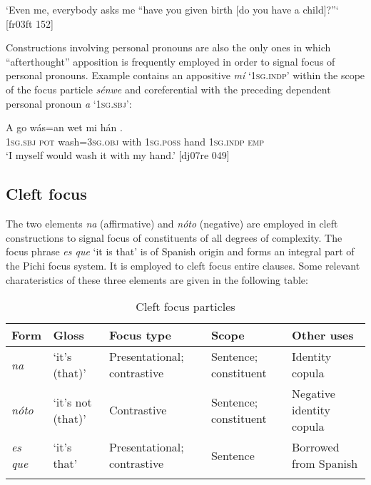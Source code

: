 \glt ‘Even me, everybody asks me “have you given birth 
[do you have a child]?”‘ [fr03ft 152]
\z

Constructions involving personal pronouns are also the only ones in which “afterthought” apposition is frequently employed in order to signal focus of personal pronouns. Example  contains an appositive \textit{mí} ‘\textsc{1sg.indp’} within the scope of the focus particle \textit{sénwe} and\textit{} coreferential with the preceding dependent personal pronoun \textit{a} ‘\textsc{1sg.sbj’}:


\ea%
    \label{ex:key:689}
    \gll A    go  wás=an    wet  mi    hán     .\\
\textsc{1sg.sbj}  \textsc{pot}  wash=\textsc{3sg.obj}  with  \textsc{1sg.poss}  hand  \textsc{1sg.indp}  \textsc{emp}\\

\glt ‘\textsc{I} myself would wash it with my hand.’ [dj07re 049]
\z

\subsection{Cleft focus} \label{sec:7.4.3}

The two elements \textit{na} (affirmative) and \textit{nóto} (negative) are employed in cleft constructions to signal focus of constituents of all degrees of complexity. The focus phrase \textit{es que} ‘it is that’ is of Spanish origin and forms an integral part of the Pichi focus system. It is employed to cleft focus entire clauses. Some relevant charateristics of these three elements are given in the following table: 

\begin{table}
\caption{Cleft focus particles}
\label{tab:key:7.6}

\begin{tabularx}{\textwidth}{llQQQ}
\lsptoprule

Form & Gloss & Focus type & Scope & Other uses\\
\midrule
\itshape na & ‘it’s (that)’ & Presentational; contrastive & Sentence; constituent & Identity copula\\
\tablevspace
\itshape nóto & ‘it’s not (that)’ & Contrastive & Sentence; constituent & Negative identity copula\\
\tablevspace
  \itshape es que & ‘it’s that’ & Presentational; contrastive & Sentence & Borrowed from Spanish\\
\lspbottomrule
\end{tabularx}
\end{table}
